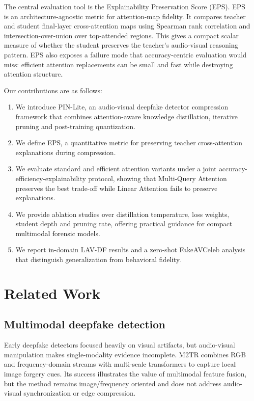 \documentclass[pdflatex,sn-basic,Numbered]{sn-jnl}
\begin{document}
The central evaluation tool is the Explainability Preservation Score (EPS). EPS is an architecture-agnostic metric for attention-map fidelity. It compares teacher and student final-layer cross-attention maps using Spearman rank correlation and intersection-over-union over top-attended regions. This gives a compact scalar measure of whether the student preserves the teacher's audio-visual reasoning pattern. EPS also exposes a failure mode that accuracy-centric evaluation would miss: efficient attention replacements can be small and fast while destroying attention structure.

Our contributions are as follows:
\begin{enumerate}
    \item We introduce PIN-Lite, an audio-visual deepfake detector compression framework that combines attention-aware knowledge distillation, iterative pruning and post-training quantization.
    \item We define EPS, a quantitative metric for preserving teacher cross-attention explanations during compression.
    \item We evaluate standard and efficient attention variants under a joint accuracy-efficiency-explainability protocol, showing that Multi-Query Attention preserves the best trade-off while Linear Attention fails to preserve explanations.
    \item We provide ablation studies over distillation temperature, loss weights, student depth and pruning rate, offering practical guidance for compact multimodal forensic models.
    \item We report in-domain LAV-DF results and a zero-shot FakeAVCeleb analysis that distinguish generalization from behavioral fidelity.
\end{enumerate}

\section{Related Work}\label{sec:related}

\subsection{Multimodal deepfake detection}\label{subsec:multimodal}

Early deepfake detectors focused heavily on visual artifacts, but audio-visual manipulation makes single-modality evidence incomplete. M2TR \cite{wang2022m2tr} combines RGB and frequency-domain streams with multi-scale transformers to capture local image forgery cues. Its success illustrates the value of multimodal feature fusion, but the method remains image/frequency oriented and does not address audio-visual synchronization or edge compression.
\end{document}
